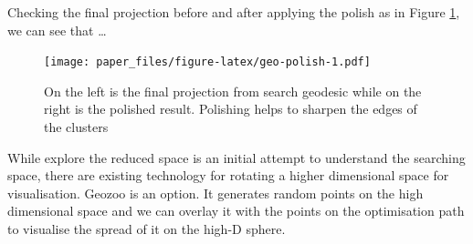\documentclass[12pt]{article}
\newenvironment{Shaded}{\begin{snugshade}}{\end{snugshade}}
\newcommand{\DataTypeTok}[1]{\textcolor[rgb]{0.13,0.29,0.53}{#1}}
\newcommand{\DecValTok}[1]{\textcolor[rgb]{0.00,0.00,0.81}{#1}}
\newcommand{\KeywordTok}[1]{\textcolor[rgb]{0.13,0.29,0.53}{\textbf{#1}}}
\newcommand{\NormalTok}[1]{#1}
\newcommand{\OperatorTok}[1]{\textcolor[rgb]{0.81,0.36,0.00}{\textbf{#1}}}
\newcommand{\OtherTok}[1]{\textcolor[rgb]{0.56,0.35,0.01}{#1}}
\newcommand{\StringTok}[1]{\textcolor[rgb]{0.31,0.60,0.02}{#1}}
\begin{document}
\begin{Shaded}
\end{Shaded}

Checking the final projection before and after applying the polish as in Figure \ref{geo-polish}, we can see that \ldots{}

\begin{figure}
\centering
\texttt{[image: paper\_files/figure-latex/geo-polish-1.pdf]}
\caption{\label{fig:geo-polish}\label{geo-polish}On the left is the final projection from search geodesic while on the right is the polished result. Polishing helps to sharpen the edges of the clusters}
\end{figure}

While explore the reduced space is an initial attempt to understand the searching space, there are existing technology for rotating a higher dimensional space for visualisation. Geozoo is an option. It generates random points on the high dimensional space and we can overlay it with the points on the optimisation path to visualise the spread of it on the high-D sphere.
\end{document}
